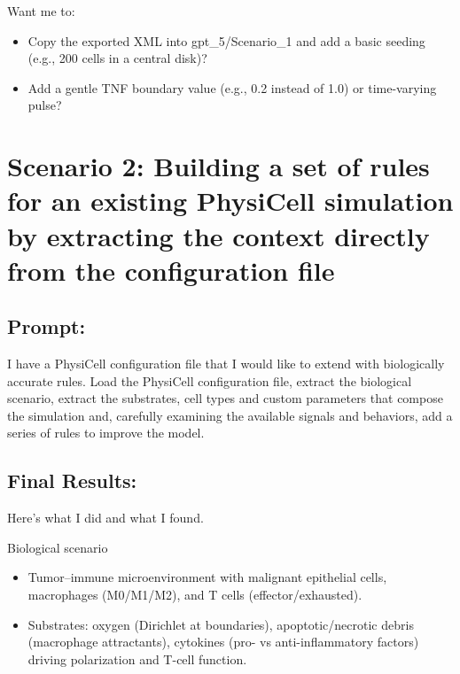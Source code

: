 Want me to:

\begin{itemize}
\tightlist
\item
  Copy the exported XML into gpt\_5/Scenario\_1 and add a basic seeding
  (e.g., 200 cells in a central disk)?
\item
  Add a gentle TNF boundary value (e.g., 0.2 instead of 1.0) or
  time-varying pulse?
\end{itemize}

\hypertarget{scenario-2-building-a-set-of-rules-for-an-existing-physicell-simulation-by-extracting-the-context-directly-from-the-configuration-file}{%
\section{Scenario 2: Building a set of rules for an existing PhysiCell
simulation by extracting the context directly from the configuration
file}\label{scenario-2-building-a-set-of-rules-for-an-existing-physicell-simulation-by-extracting-the-context-directly-from-the-configuration-file}}

\hypertarget{prompt-1}{%
\subsection{Prompt:}\label{prompt-1}}

I have a PhysiCell configuration file that I would like to extend with
biologically accurate rules. Load the PhysiCell configuration file,
extract the biological scenario, extract the substrates, cell types and
custom parameters that compose the simulation and, carefully examining
the available signals and behaviors, add a series of rules to improve
the model.

\hypertarget{final-results-1}{%
\subsection{Final Results:}\label{final-results-1}}

Here's what I did and what I found.

Biological scenario

\begin{itemize}
\tightlist
\item
  Tumor--immune microenvironment with malignant epithelial cells,
  macrophages (M0/M1/M2), and T cells (effector/exhausted).
\item
  Substrates: oxygen (Dirichlet at boundaries), apoptotic/necrotic
  debris (macrophage attractants), cytokines (pro- vs anti-inflammatory
  factors) driving polarization and T-cell function.
\end{itemize}

